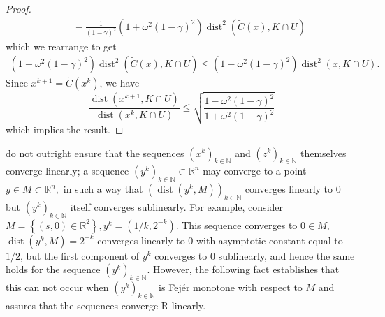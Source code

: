 \documentclass[smallextended,numbook,nospthms]{svjour3}
\theoremstyle{plain}
\theoremstyle{definition}
\def\RR{\mathds R}
\def\NN{\mathds N}
\DeclareMathOperator{\dist}{dist}
\begin{document}
\begin{proof}
\begin{align}
		&\quad-\frac{1}{(1-\gamma)^2}\left(1+\omega^{2}(1-\gamma)^{2}\right) \dist^{2}(\tilde{C}(x), K \cap U)\,
	\end{align}
	which we rearrange to get
	\begin{align}
	    \left(1+\omega^{2}(1-\gamma)^{2}\right) \dist^{2}(\tilde{C}(x), K \cap U) \leq \left(1-\omega^{2}(1-\gamma)^{2}\right) \dist^{2}(x, K \cap U).
	\end{align}
	Since $x^{k+1}=\tilde{C}\left(x^{k}\right)$, we have
	\begin{equation}
		\frac{\dist\left(x^{k+1}, K \cap U\right)}{\dist\left(x^{k}, K \cap U\right)} \leq 	\sqrt{\frac{1-\omega^{2}(1-\gamma)^{2}}{1+\omega^{2}(1-\gamma)^{2}}}
	\end{equation}
	which implies the result.
\end{proof}

 do not outright ensure that the sequences $\left(x^{k}\right)_{k \in \NN}$ and $\left(z^{k}\right)_{k \in \NN}$ themselves converge linearly; a sequence $\left(y^{k}\right)_{k \in \NN} \subset \RR^{n}$ may converge to a point $y \in M \subset \RR^{n},$ in such a way that $\left(\dist\left(y^{k}, M\right)\right)_{k \in \NN}$ converges linearly to 0 but $\left(y^{k}\right)_{k \in \NN}$ itself converges sublinearly. For example, consider $M=\left\{(s, 0) \in \mathbb{R}^{2}\right\}, y^{k}=\left(1 / k, 2^{-k}\right)$. This sequence converges to $0 \in M$, $\operatorname{dist}\left(y^{k}, M\right)=2^{-k}$ converges
linearly to 0 with asymptotic constant equal to $1/2$, but the first component of $y^{k}$ converges to 0 sublinearly, and hence the same holds for the sequence $\left(y^{k}\right)_{k \in \mathbb{N}}$. However, the following fact establishes that this can not occur when $\left(y^{k}\right)_{k \in \NN}$ is Fejér monotone with respect to $M$ and assures that the sequences converge R-linearly.
\end{document}
